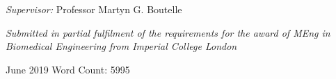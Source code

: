 \begin{titlepage}
\begin{center}
\large
\textit{Supervisor:}
Professor Martyn G. Boutelle


\vspace{5cm}
\small
\textit{Submitted in partial fulfilment of the requirements for the award of MEng in Biomedical Engineering from Imperial College London}

\end{center}

\vspace{2.5cm}
June 2019   \hfill  Word Count: 5995

\vfill %



\makeatother


\end{titlepage}